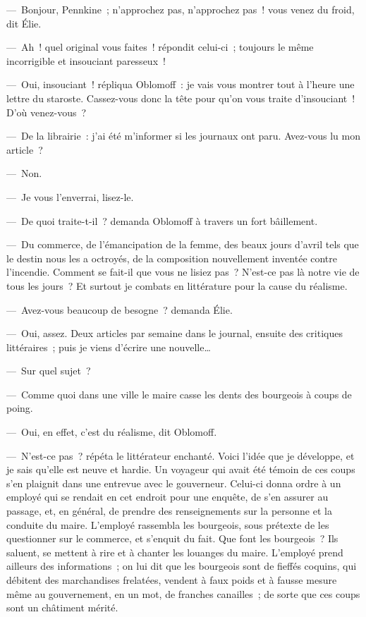 \documentclass[french,twoside]{book} %
\begin{document}
— Bonjour, Pennkine ; n’approchez pas, n’approchez pas ! vous venez du froid, dit Élie.\par
— Ah ! quel original vous faites ! répondit celui-ci ; toujours le même incorrigible et insouciant paresseux !\par
— Oui, insouciant ! répliqua Oblomoff : je vais vous montrer tout à l’heure une lettre du staroste. Cassez-vous donc la tête pour qu’on vous traite d’insouciant ! D’où venez-vous ?\par
— De la librairie : j’ai été m’informer si les journaux ont paru. Avez-vous lu mon article ?\par
— Non.\par
— Je vous l’enverrai, lisez-le.\par
— De quoi traite-t-il ? demanda Oblomoff à travers un fort bâillement.\par
— Du commerce, de l’émancipation de la femme, des beaux jours d’avril tels que le destin nous les a octroyés, de la composition nouvellement inventée contre l’incendie. Comment se fait-il que vous ne lisiez pas ? N’est-ce pas là notre vie de tous les jours ? Et surtout je combats en littérature pour la cause du réalisme.\par
— Avez-vous beaucoup de besogne ? demanda Élie.\par
— Oui, assez. Deux articles par semaine dans le journal, ensuite des critiques littéraires ; puis je viens d’écrire une nouvelle…\par
— Sur quel sujet ?\par
— Comme quoi dans une ville le maire casse les dents des bourgeois à coups de poing.\par
— Oui, en effet, c’est du réalisme, dit Oblomoff.\par
— N’est-ce pas ? répéta le littérateur enchanté. Voici l’idée que je développe, et je sais qu’elle est neuve et hardie. Un voyageur qui avait été témoin de ces coups s’en plaignit dans une entrevue avec le gouverneur. Celui-ci donna ordre à un employé qui se rendait en cet endroit pour une enquête, de s’en assurer au passage, et, en général, de prendre des renseignements sur la personne et la conduite du maire. L’employé rassembla les bourgeois, sous prétexte de les questionner sur le commerce, et s’enquit du fait. Que font les bourgeois ? Ils saluent, se mettent à rire et à chanter les louanges du maire. L’employé prend ailleurs des informations ; on lui dit que les bourgeois sont de fieffés coquins, qui débitent des marchandises frelatées, vendent à faux poids et à fausse mesure même au gouvernement, en un mot, de franches canailles ; de sorte que ces coups sont un châtiment mérité.\par
\end{document}
